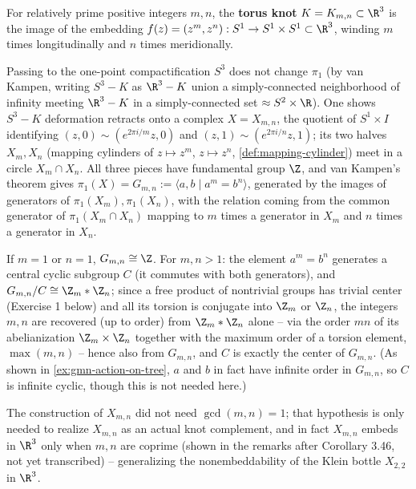\begin{example}
\label{ex:torus-knot-complement-fundamental-group}
For relatively prime positive integers $m,n$, the \textbf{torus knot} $K=K_{m,n}\subset\R^3$
is the image of the embedding $f(z)=(z^m,z^n) : S^1 \to S^1\times S^1 \subset \R^3$, winding
$m$ times longitudinally and $n$ times meridionally.



Passing to the one-point compactification $S^3$ does not change $\pi_1$ (by van
Kampen, writing $S^3-K$ as $\R^3-K$ union a simply-connected neighborhood of
infinity meeting $\R^3-K$ in a simply-connected set $\approx S^2\times\R$). One shows
$S^3-K$ deformation retracts onto a complex $X=X_{m,n}$, the quotient of
$S^1\times I$ identifying $(z,0)\sim(e^{2\pi i/m}z,0)$ and $(z,1)\sim(e^{2\pi i/n}z,1)$; its two
halves $X_m,X_n$ (mapping cylinders of $z\mapsto z^m$, $z\mapsto z^n$,
\cref{def:mapping-cylinder}) meet in a circle $X_m\cap X_n$. All three pieces have
fundamental group $\Z$, and van Kampen's theorem gives
$\pi_1(X) = G_{m,n} := \langle a,b \mid a^m=b^n\rangle$, generated by the images of
generators of $\pi_1(X_m),\pi_1(X_n)$, with the relation coming from the common
generator of $\pi_1(X_m\cap X_n)$ mapping to $m$ times a generator in $X_m$ and $n$
times a generator in $X_n$.

If $m=1$ or $n=1$, $G_{m,n} \cong \Z$. For $m,n>1$: the element $a^m=b^n$
generates a central cyclic subgroup $C$ (it commutes with both generators), and
$G_{m,n}/C \cong \Z_m * \Z_n$; since a free product of nontrivial groups has trivial
center (Exercise 1 below) and all its torsion is conjugate into $\Z_m$ or $\Z_n$, the
integers $m,n$ are recovered (up to order) from $\Z_m*\Z_n$ alone -- via the order
$mn$ of its abelianization $\Z_m\times\Z_n$ together with the maximum order of a
torsion element, $\max(m,n)$ -- hence also from $G_{m,n}$, and $C$ is exactly the
center of $G_{m,n}$. (As shown in \cref{ex:gmn-action-on-tree}, $a$ and $b$ in fact
have infinite order in $G_{m,n}$, so $C$ is infinite cyclic, though this is not needed here.)

The construction of $X_{m,n}$ did not need $\gcd(m,n)=1$; that hypothesis is only
needed to realize $X_{m,n}$ as an actual knot complement, and in fact $X_{m,n}$
embeds in $\R^3$ only when $m,n$ are coprime (shown in the remarks after
Corollary 3.46, not yet transcribed) -- generalizing the nonembeddability of the
Klein bottle $X_{2,2}$ in $\R^3$.
\end{example}


